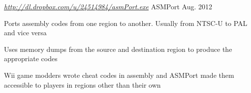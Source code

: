 \begin{cventries}
{\begin{cvitems}
      \end{cvitems}
    }
\fi
\iffalse
  \cventry
  {\textit{\url{http://supastuff.github.io/modcodegen/} } }
    {Modcodegen}
    {Nov. 2012}
    {}
    {
      \begin{cvitems}
        \item {Simplifies the use of the weapon modifier codes for Monster Hunter Tri}
        \item {Populates the dropdown boxes with text extracted from a memory dump of the game using JavaScript}
        \item {The YouTube video under “Weapons” demonstrates a roller code used to see all of the sharpness levels}
      \end{cvitems}
    }
\fi
\iftrue
  \cventry
  {\textit{\url{http://dl.dropbox.com/u/24514984/asmPort.exe} } }
    {ASMPort}
    {Aug. 2012}
    {}
    {
      \begin{cvitems}
        \item {Ports assembly codes from one region to another. Usually from NTSC-U to PAL and vice versa}
        \item {Uses memory dumps from the source and destination region to produce the appropriate codes}
        \item {Wii game modders wrote cheat codes in assembly and ASMPort made them accessible to players in regions other than their own}
      \end{cvitems}
    }
\fi

\end{cventries}
